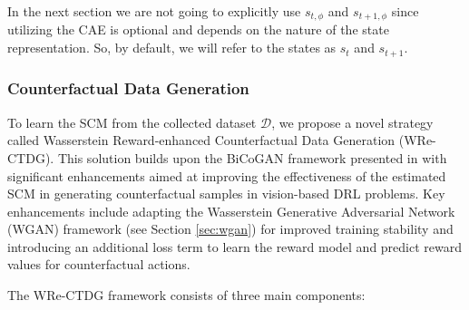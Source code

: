 In the next section we are not going to explicitly use
\( s_{t,\phi} \) and \( s_{t+1,\phi} \) since utilizing the
CAE is optional and depends on the nature of the state representation.
So, by default, we will refer to the states as \( s_t \) and \( s_{t+1} \).

\subsubsection{Counterfactual Data Generation}

To learn the SCM from the collected dataset \( \mathcal{D} \),
we propose a novel strategy called
Wasserstein Reward-enhanced Counterfactual Data Generation (WRe-CTDG).
This solution builds upon the BiCoGAN framework presented in \cite{lu2020}
with significant enhancements
aimed at improving the effectiveness of the estimated SCM in generating
counterfactual samples in vision-based DRL problems. Key enhancements
include adapting the Wasserstein Generative Adversarial Network (WGAN)
framework (see Section \ref{sec:wgan})
for improved training stability and introducing an additional
loss term to learn the reward model and predict reward values for counterfactual
actions.

The WRe-CTDG framework consists of three main components:

